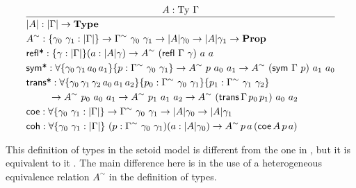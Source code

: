 \documentclass{easychair}
\newcommand{\GG}{\Gamma}
\newcommand{\mType}{\mathbf{Type}}
\newcommand{\mProp}{\mathbf{Prop}}
\newcommand{\Ty}{\mathrm{Ty}}
\begin{document}
\[
\infer{
  \begin{aligned}
    & | A | : | \GG | \to \mType \\
    & A^\sim : \{\gamma_0\ \gamma_1 : | \GG |\}
    \to \GG^\sim\ \gamma_0\ \gamma_1 \to | A | \gamma_0 \to | A | \gamma_1 \to \mProp \\
    & \textsf{refl*} : \{\gamma : | \GG | \} (a : | A | \gamma) \to A^\sim\ (\textsf{refl}\ \GG\ \gamma)\ a\ a \\
    & \textsf{sym*} : \forall\{\gamma_0\,\gamma_1\,a_0\,a_1\}\{p : \GG^\sim\ \gamma_0\ \gamma_1\}
    \to A^\sim\ p\ a_0\ a_1 \to A^\sim\ (\textsf{sym}\ \GG\ p)\ a_1\ a_0 \\
    & \textsf{trans*} : \forall\{\gamma_0\,\gamma_1\,\gamma_2\,a_0\,a_1\,a_2\}\{p_0 : \GG^\sim\ \gamma_0\ \gamma_1\}\{p_1 : \GG^\sim\ \gamma_1\ \gamma_2\}\\
    & \ \qquad \to A^\sim\ p_0\ a_0\ a_1\to A^\sim\ p_1\ a_1\ a_2\to A^\sim\ (\textsf{trans}\,\GG\,p_0\,p_1)\ a_0\ a_2\\
    & \textsf{coe} : \forall\{\gamma_0\ \gamma_1 : | \GG |\} \to \GG^\sim\ \gamma_0\ \gamma_1 \to | A | \gamma_0 \to | A | \gamma_1 \\
    & \textsf{coh} : \forall\{\gamma_0\ \gamma_1 : | \GG |\} \ (p : \GG^\sim\ \gamma_0\ \gamma_1) (a : | A | \gamma_0)
    \to A^\sim\,p\,a\,(\textsf{coe}\,A\,p\,a) \\
  \end{aligned}
}{
  A : \Ty\ \GG
}
\]

This definition of types in the setoid model is different from the one in
\cite{setoid99}, but it is equivalent to it \cite[Section 1.6.1]{simonthesis}. The main
difference here is in the use of a heterogeneous equivalence relation $A^\sim$
in the definition of types.
\end{document}
